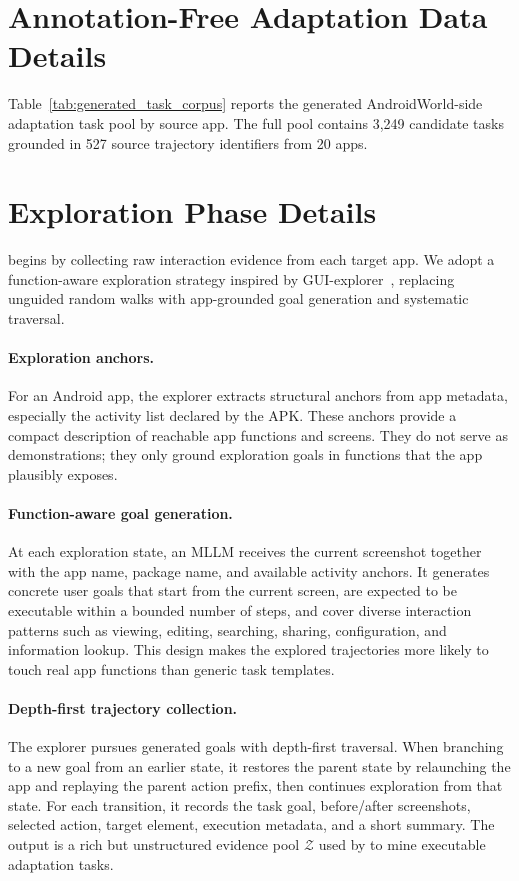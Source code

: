 \section{Annotation-Free Adaptation Data Details}
\label{sec:appendix_data_details}

Table~\ref{tab:generated_task_corpus} reports the generated AndroidWorld-side adaptation task pool by source app. The full pool contains 3,249 candidate tasks grounded in 527 source trajectory identifiers from 20 apps.



\section{Exploration Phase Details}
\label{sec:exploration_details}

\mobilegym begins by collecting raw interaction evidence from each target app. We adopt a function-aware exploration strategy inspired by GUI-explorer~\citep{xie2025gui}, replacing unguided random walks with app-grounded goal generation and systematic traversal.

\paragraph{Exploration anchors.}
For an Android app, the explorer extracts structural anchors from app metadata, especially the activity list declared by the APK. These anchors provide a compact description of reachable app functions and screens. They do not serve as demonstrations; they only ground exploration goals in functions that the app plausibly exposes.

\paragraph{Function-aware goal generation.}
At each exploration state, an MLLM receives the current screenshot together with the app name, package name, and available activity anchors. It generates concrete user goals that start from the current screen, are expected to be executable within a bounded number of steps, and cover diverse interaction patterns such as viewing, editing, searching, sharing, configuration, and information lookup. This design makes the explored trajectories more likely to touch real app functions than generic task templates.

\paragraph{Depth-first trajectory collection.}
The explorer pursues generated goals with depth-first traversal. When branching to a new goal from an earlier state, it restores the parent state by relaunching the app and replaying the parent action prefix, then continues exploration from that state. For each transition, it records the task goal, before/after screenshots, selected action, target element, execution metadata, and a short summary. The output is a rich but unstructured evidence pool $\mathcal{Z}$ used by \curriculum to mine executable adaptation tasks.

